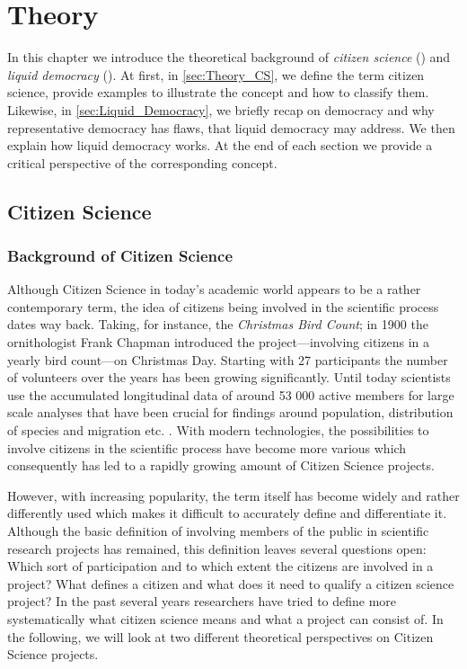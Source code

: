 \chapter{Theory}
\label{ch:Theory}

In this chapter we introduce the theoretical background of \textit{citizen science} () and \textit{liquid democracy} (). At first, in \autoref{sec:Theory_CS}, we define the term citizen science, provide examples to illustrate the concept and how to classify them. Likewise, in \autoref{sec:Liquid_Democracy}, we briefly recap on democracy and why representative democracy has flaws, that liquid democracy may address. We then explain how liquid democracy works. At the end of each section we provide a critical perspective of the corresponding concept.


\section{Citizen Science}
\label{sec:Theory_CS}
\subsection{Background of Citizen Science}
\label{ssec:Background_CS}
Although Citizen Science in today’s academic world appears to be a rather contemporary term, the idea of citizens being involved in the scientific process dates way back. Taking, for instance, the \textit{Christmas Bird Count}; in 1900 the ornithologist Frank Chapman introduced the project---involving citizens in a yearly bird count---on Christmas Day. Starting with 27 participants the number of volunteers over the years has been growing significantly. Until today scientists use the accumulated longitudinal data of around 53 000 active members for large scale analyses that have been crucial for findings around population, distribution of species and migration etc. \parencite{Lebaron2017}. With modern technologies, the possibilities to involve citizens in the scientific process have become more various which consequently has led to a rapidly growing amount of Citizen Science projects. 

However, with increasing popularity, the term itself has become widely and rather differently used which makes it difficult to accurately define and differentiate it. Although the basic definition of involving members of the public in scientific research projects has remained, this definition leaves several questions open: Which sort of participation and to which extent the citizens are involved in a project? What defines a citizen and what does it need to qualify a citizen science project? In the past several years researchers have tried to define more systematically what citizen science means and what a  project can consist of. In the following, we will look at two  different theoretical perspectives on Citizen Science projects. 



